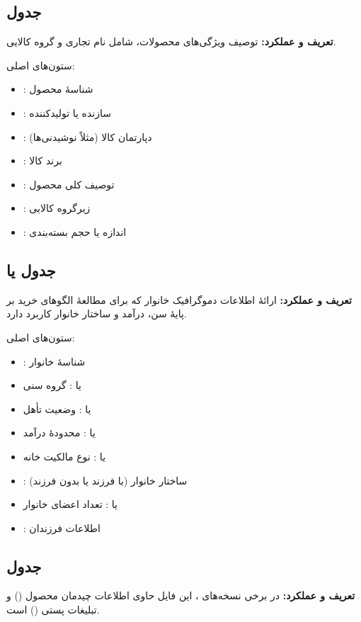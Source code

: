 \documentclass[12pt]{article}
\begin{document}
\subsection{\textbf{جدول }}
\noindent \textbf{تعریف و عملکرد:} توصیف ویژگی‌های محصولات، شامل نام تجاری و گروه کالایی.

\noindent ستون‌های اصلی:
\begin{itemize}
  \item {}: شناسهٔ محصول
  \item {}: سازنده یا تولیدکننده
  \item {}: دپارتمان کالا (مثلاً نوشیدنی‌ها)
  \item {}: برند کالا
  \item {}: توصیف کلی محصول
  \item {}: زیرگروه کالایی
  \item {}: اندازه یا حجم بسته‌بندی
\end{itemize}

\subsection{\textbf{جدول  یا }}
\noindent \textbf{تعریف و عملکرد:} ارائهٔ اطلاعات دموگرافیک خانوار که برای مطالعهٔ الگوهای خرید بر پایهٔ سن، درآمد و ساختار خانوار کاربرد دارد.

\noindent ستون‌های اصلی:
\begin{itemize}
  \item {}: شناسهٔ خانوار
  \item {} یا : گروه سنی
  \item {} یا : وضعیت تأهل
  \item {} یا : محدودهٔ درآمد
  \item {} یا : نوع مالکیت خانه
  \item {}: ساختار خانوار (با فرزند یا بدون فرزند)
  \item {} یا : تعداد اعضای خانوار
  \item {}: اطلاعات فرزندان
\end{itemize}

\subsection{\textbf{جدول }}
\noindent \textbf{تعریف و عملکرد:} در برخی نسخه‌های ، این فایل حاوی اطلاعات چیدمان محصول () و تبلیغات پستی () است.
\end{document}
